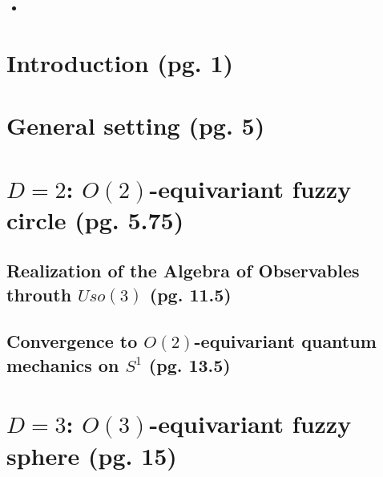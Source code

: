 \documentclass{article}
\begin{document}
    \begin{itemize}

    \item 
    
    \end{itemize}

\section{Introduction (pg. 1)}

\section{General setting (pg. 5)}

\section{$D=2$: $O(2)$-equivariant fuzzy circle (pg. 5.75)}

\subsection{Realization of the Algebra of Observables throuth $Uso(3)$ (pg. 11.5)}

\subsection{Convergence to $O(2)$-equivariant quantum mechanics on $S^1$ (pg. 13.5)}

\section{$D=3$: $O(3)$-equivariant fuzzy sphere (pg. 15)}
\end{document}
